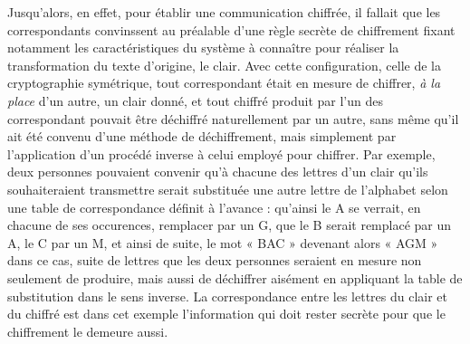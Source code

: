Jusqu’alors, en effet, pour établir une communication chiffrée, il fallait que les correspondants
convinssent au préalable d’une règle secrète de chiffrement fixant notamment les caractéristiques du
système à connaître pour réaliser la transformation du texte d’origine, le clair.
Avec cette configuration, celle de la cryptographie symétrique, tout correspondant était en mesure
de chiffrer, \emph{à la place} d’un autre, un clair donné, et tout chiffré produit par l’un des
correspondant pouvait être déchiffré naturellement par un autre, sans même qu’il ait été convenu
d’une méthode de déchiffrement, mais simplement par l’application d’un procédé inverse à celui
employé pour chiffrer.
Par exemple, deux personnes pouvaient convenir qu’à chacune des lettres d’un clair qu’ils
souhaiteraient transmettre serait substituée une autre lettre de l’alphabet selon une table de
correspondance définit à l’avance : qu’ainsi le A se verrait, en chacune de ses occurences,
remplacer par un G, que le B serait remplacé par un A, le C par un M,
et ainsi de suite, le mot « BAC » devenant alors « AGM » dans ce cas, suite
de lettres que les deux personnes seraient en mesure non seulement de produire, mais aussi de
déchiffrer aisément en appliquant la table de substitution dans le sens inverse.
La correspondance entre les lettres du clair et du chiffré est dans cet exemple l’information qui
doit rester secrète pour que le chiffrement le demeure aussi.


